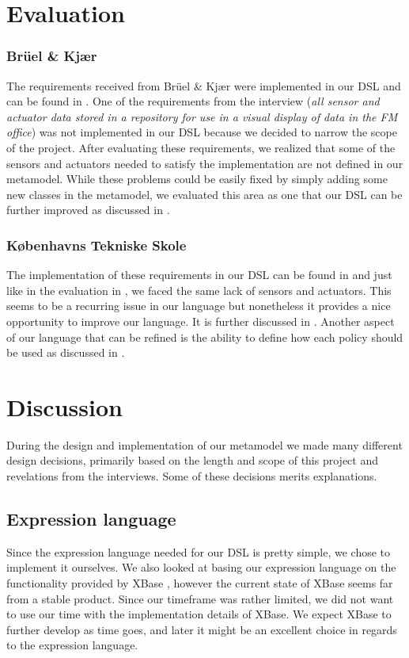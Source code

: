 \documentclass{llncs}
\begin{document}
\section{Evaluation}\label{sec:evaluation}

\subsubsection{Br\"{u}el \& Kj\ae r}\label{subsec:bruel}
The requirements received from Br\"{u}el \& Kj\ae r were implemented in our DSL and can be found in . One of the requirements from the interview (\textit{all sensor and actuator data stored in a repository for use in a visual display of data in the FM office}) was not implemented in our DSL because we decided to narrow the scope of the project. After evaluating these requirements, we realized that some of the sensors and actuators needed to satisfy the implementation are not defined in our metamodel. While these problems could be easily fixed by simply adding some new classes in the metamodel, we evaluated this area as one that our DSL can be further improved as discussed in .

\subsubsection{K\o benhavns Tekniske Skole}\label{subsec:kts}
The implementation of these requirements in our DSL can be found in  and just like in the evaluation in , we faced the same lack of sensors and actuators. This seems to be a recurring issue in our language but nonetheless it provides a nice opportunity to improve our language. It is further discussed in . 
Another aspect of our language that can be refined is the ability to define how each policy should be used as discussed in . 
 
\section{Discussion}\label{sec:discussion}
During the design and implementation of our metamodel we made many different design decisions, primarily based on the length and scope of this project and revelations from the interviews. Some of these decisions merits explanations.

\subsection{Expression language}
Since the expression language needed for our DSL is pretty simple, we chose to implement it ourselves. We also looked at basing our expression language on the functionality provided by XBase \cite{xbase}, however the current state of XBase seems far from a stable product. Since our timeframe was rather limited, we did not want to use our time with the implementation details of XBase. We expect XBase to further develop as time goes, and later it might be an excellent choice in regards to the expression language.
\end{document}
